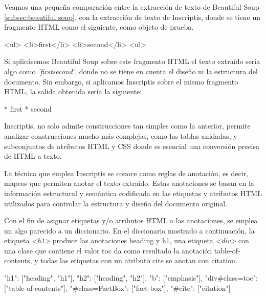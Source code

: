 Veamos una pequeña comparación entre la extracción de texto de Beautiful Soup \ref{subsec:beautiful soup}, 
con la extracción de texto de Inscriptis, donde se tiene un fragmento HTML como el siguiente, como objeto 
de prueba.

\begin{Schunk}
  \begin{Soutput}
    <ul>
        <li>first</li>
        <li>second</li>
    <ul>
  \end{Soutput}
\end{Schunk}

Si aplicásemos Beautiful Soup sobre este fragmento HTML el texto extraído sería algo como \emph{'firstsecond'},
donde no se tiene en cuenta el diseño ni la estructura del documento. Sin embargo, si aplicamos Inscriptis
sobre el mismo fragmento HTML, la salida obtenida sería la siguiente:

\begin{Schunk}
  \begin{Soutput}
    * first
    * second
  \end{Soutput}
\end{Schunk}

Inscriptis, no solo admite construcciones tan simples como la anterior, permite analizar construcciones 
mucho más complejas, como las tablas anidadas, y subconjuntos de atributos HTML y CSS donde es esencial 
una conversión precisa de HTML a texto.

La técnica que emplea Inscriptis se conoce como reglas de anotación, es decir, mapeos que permiten anotar 
el texto extraído. Estas anotaciones se basan en la información estructural y semántica codificada en las 
etiquetas y atributos HTML utilizados para controlar la estructura y diseño del documento original. 

Con el fin de asignar etiquetas y/o atributos HTML a las anotaciones, se emplea un algo parecido a un 
diccionario. En el diccionario mostrado a continuación, la etiqueta \emph{<h1>} produce las anotaciones 
heading y h1, una etiqueta \emph{<div>} con una clase que contiene el valor toc da como resultado la 
anotación table-of-contents, y todas las etiquetas con un atributo cite se anotan con citation.

\begin{Schunk}
  \begin{Soutput}
    {
      "h1": ["heading", "h1"],
      "h2": ["heading", "h2"],
      "b": ["emphasis"],
      "div#class=toc": ["table-of-contents"],
      "#class=FactBox": ["fact-box"],
      "#cite": ["citation"]
    }
  \end{Soutput}
\end{Schunk}

